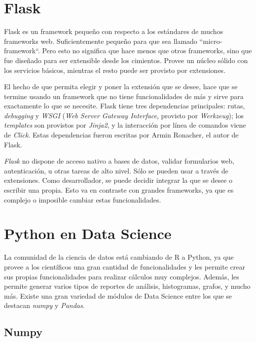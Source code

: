 \section[Flask]{Flask}

Flask es un framework pequeño con respecto a los estándares de muchos frameworks web. Suficientemente pequeño para que sea llamado “micro-framework“\cite{Fsck}. Pero esto no significa que hace menos que otros frameworks, sino que fue diseñado para ser extensible desde los cimientos. Provee un núcleo sólido con los servicios básicos, mientras el resto puede ser provisto por extensiones. 

El hecho de que permita elegir y poner la extensión que se desee, hace que se termine usando un framework que no tiene funcionalidades de más y sirve para exactamente lo que se necesite.
Flask tiene tres dependencias principales: rutas, \textit{debugging} y \textit{WSGI} (\textit{Web Server Gateway Interface}, provisto por \textit{Werkzeug}); los \textit{templates} son provistos por \textit{Jinja2}, y la interacción por línea de comandos viene de \textit{Click}. Estas dependencias fueron escritas por Armin Ronacher, el autor de Flask.

\textit{Flask} no dispone de acceso nativo a bases de datos, validar formularios web, autenticación, u otras tareas de alto nivel. Sólo se pueden usar a través de extensiones. Como desarrollador, se puede decidir integrar la que se desee o escribir una propia. Esto va en contraste con grandes frameworks, ya que es complejo o imposible cambiar estas funcionalidades.

\section[Python en Data Science]{Python en Data Science}

La comunidad de la ciencia de datos está cambiando de R a Python, ya que provee a los científicos una gran cantidad de funcionalidades y les permite crear sus propias funcionalidades para realizar cálculos muy complejos. Además, les permite generar varios tipos de reportes de análisis, histogramas, grafos, y mucho más.
Existe una gran variedad de módulos de Data Science entre los que se destacan \textit{numpy} y \textit{Pandas}.

\subsection[Numpy]{Numpy}

